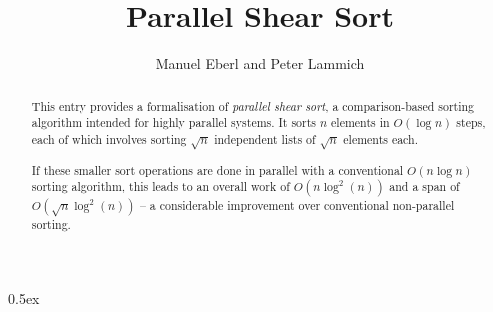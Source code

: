 \documentclass[11pt,a4paper]{article}
\begin{document}
\title{Parallel Shear Sort}
\author{Manuel Eberl and Peter Lammich}
\maketitle

\begin{abstract}
This entry provides a formalisation of \emph{parallel shear sort}, a comparison-based sorting
algorithm intended for highly parallel systems. It sorts $n$ elements in $O(\log n)$ steps,
each of which involves sorting $\sqrt{n}$ independent lists of $\sqrt{n}$ elements each.

If these smaller sort operations are done in parallel with a conventional $O(n\log n)$ sorting
algorithm, this leads to an overall work of $O(n \log^2(n))$ and a span of 
$O(\sqrt{n}\log^2(n))$ -- a considerable improvement over conventional non-parallel sorting.
\end{abstract}

\tableofcontents

\newpage
\parindent 0pt\parskip 0.5ex



\nocite{sss86}
\raggedright


\end{document}

